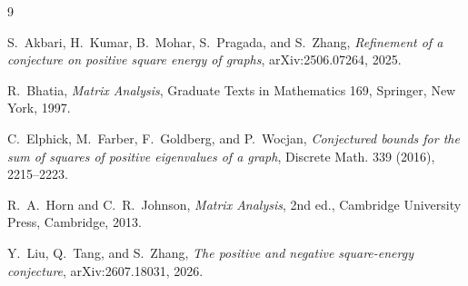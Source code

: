 \documentclass[11pt]{article}
\theoremstyle{remark}
\begin{document}
\begin{thebibliography}{9}

S.~Akbari, H.~Kumar, B.~Mohar, S.~Pragada, and S.~Zhang,
\emph{Refinement of a conjecture on positive square energy of graphs},
arXiv:2506.07264, 2025.

R.~Bhatia,
\emph{Matrix Analysis},
Graduate Texts in Mathematics 169, Springer, New York, 1997.

C.~Elphick, M.~Farber, F.~Goldberg, and P.~Wocjan,
\emph{Conjectured bounds for the sum of squares of positive eigenvalues of a
graph},
Discrete Math. 339 (2016), 2215--2223.

R.~A.~Horn and C.~R.~Johnson,
\emph{Matrix Analysis}, 2nd ed.,
Cambridge University Press, Cambridge, 2013.

Y.~Liu, Q.~Tang, and S.~Zhang,
\emph{The positive and negative square-energy conjecture},
arXiv:2607.18031, 2026.

\end{thebibliography}
\end{document}
